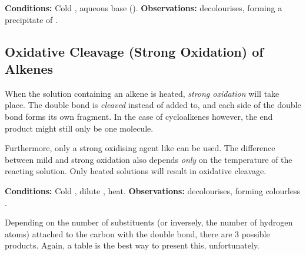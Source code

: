 		\vspace{1.5em}
		\vbox{\textbf{Conditions:}	\tabto{35mm}Cold , aqueous base ().}	%
		\vbox{\textbf{Observations:}  decolourises, forming
			a {} precipitate of .}





	\pagebreak
	\hypertarget{OxidativeCleavageOfAlkenes}{}
	\subsection{Oxidative Cleavage (Strong Oxidation) of Alkenes}

		When the  solution containing an alkene is heated, \textit{strong oxidation} will take place. The double bond is
		\textit{cleaved} instead of added to, and each side of the double bond forms its own fragment. In the case of cycloalkenes
		however, the end product might still only be one molecule.

		Furthermore, only a strong oxidising agent like  can be used. The difference between mild and strong oxidation also
		depends \textit{only} on the temperature of the reacting solution. Only heated solutions will result in oxidative cleavage.

		\vspace{1.5em}
		\vbox{\textbf{Conditions:}	\tabto{35mm}Cold , dilute , heat.}	%
		\vbox{\textbf{Observations:}  decolourises, forming colourless .}

		\vspace{1.0em}

		Depending on the number of substituents (or inversely, the number of hydrogen atoms) attached to the carbon with the double bond,
		there are 3 possible products. Again, a table is the best way to present this, unfortunately.

